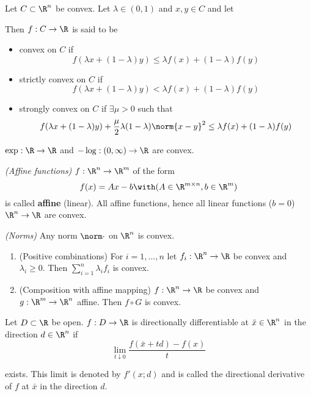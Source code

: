 Let $C\subset\R^n$ be convex. Let $\lambda\in(0,1)$ and $x,y\in C$ and let

Then $f:C\to\R$ is said to be

\begin{itemize}
  \item convex on $C$ if
        $$f(\lambda x+(1-\lambda)y)\leq\lambda f(x)+(1-\lambda)f(y)$$
  \item strictly convex on $C$ if
        $$f(\lambda x+(1-\lambda)y)<\lambda f(x)+(1-\lambda)f(y)$$
  \item strongly convex on $C$ if $\exists\mu>0$ such that
        $$f(\lambda x+(1-\lambda)y)+\frac{\mu}{2}\lambda(1-\lambda)\norm{x-y}^2\leq\lambda f(x)+(1-\lambda)f(y)$$
\end{itemize}

\label{f96c8ae}

\begin{enumerata}
  \item $\exp:\R\to\R$ and $-\log:(0,\infty)\to\R$ are convex.
  \item \textit{(Affine functions)} $f:\R^n\to\R^m$ of the form
  $$
    f(x)=Ax-b\with(A\in\R^{m\times n},b\in\R^m)
  $$
  is called \textbf{affine} (linear). All affine functions, hence
  all linear functions ($b=0$) $\R^n\to\R$ are convex.
  \item \textit{(Norms)} Any norm $\norm\cdot$ on $\R^n$ is convex.
\end{enumerata}

\label{ddce2a7}

\begin{enumerate}
  \item (Positive combinations) For $i=1,\ldots,n$ let $f_i:\R^n\to\R$ be
        convex and $\lambda_i\geq0$. Then $\sum_{i=1}^n\lambda_if_i$ is
        convex.
  \item (Composition with affine mapping) $f:\R^n\to\R$ be convex
        and $g:\R^m\to\R^n$ affine. Then $f\circ G$ is convex.
\end{enumerate}

\label{37eb747}

Let $D\subset \R$ be open. $f:D\to\R$ is directionally differentiable at $\bar
x\in\R^n$ in the direction $d\in\R^n$ if
$$
  \lim_{t\downarrow0}\frac{f(\bar x+td)-f(x)}t
$$

exists. This limit is denoted by $f'(x;d)$ and is called the directional
derivative of $f$ at $\bar x$ in the direction $d$.

